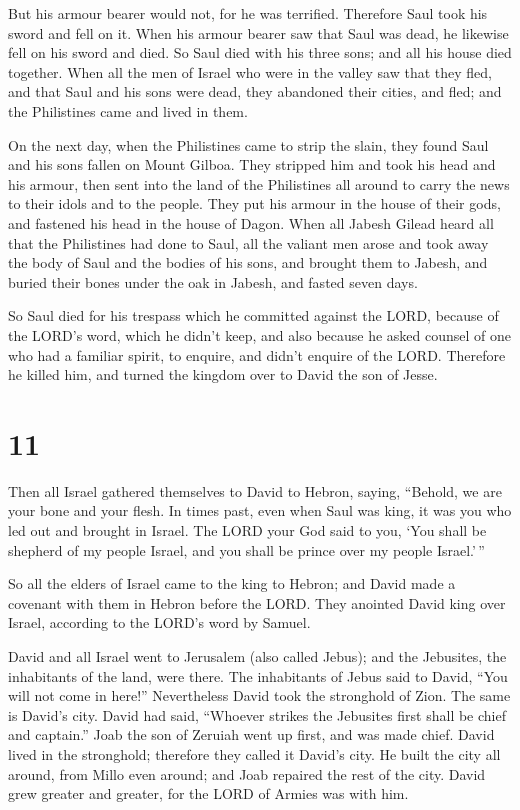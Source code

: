 But his armour bearer would not, for he was terrified. Therefore Saul
took his sword and fell on it.  When his armour bearer saw
that Saul was dead, he likewise fell on his sword and died. 
So Saul died with his three sons; and all his house died together.
 When all the men of Israel who were in the valley saw that
they fled, and that Saul and his sons were dead, they abandoned their
cities, and fled; and the Philistines came and lived in them.

 On the next day, when the Philistines came to strip the
slain, they found Saul and his sons fallen on Mount Gilboa. 
They stripped him and took his head and his armour, then sent into the
land of the Philistines all around to carry the news to their idols and
to the people.  They put his armour in the house of their
gods, and fastened his head in the house of Dagon.  When
all Jabesh Gilead heard all that the Philistines had done to Saul,
 all the valiant men arose and took away the body of Saul
and the bodies of his sons, and brought them to Jabesh, and buried their
bones under the oak in Jabesh, and fasted seven days.

 So Saul died for his trespass which he committed against
the LORD, because of the LORD's word, which he didn't keep, and also
because he asked counsel of one who had a familiar spirit, to enquire,
 and didn't enquire of the LORD. Therefore he killed him,
and turned the kingdom over to David the son of Jesse.

\hypertarget{section-10}{%
\section{11}\label{section-10}}

 Then all Israel gathered themselves to David to Hebron,
saying, ``Behold, we are your bone and your flesh.  In times
past, even when Saul was king, it was you who led out and brought in
Israel. The LORD your God said to you, `You shall be shepherd of my
people Israel, and you shall be prince over my people Israel.'\,''

 So all the elders of Israel came to the king to Hebron; and
David made a covenant with them in Hebron before the LORD. They anointed
David king over Israel, according to the LORD's word by Samuel.

 David and all Israel went to Jerusalem (also called Jebus);
and the Jebusites, the inhabitants of the land, were there. 
The inhabitants of Jebus said to David, ``You will not come in here!''
Nevertheless David took the stronghold of Zion. The same is David's
city.  David had said, ``Whoever strikes the Jebusites first
shall be chief and captain.'' Joab the son of Zeruiah went up first, and
was made chief.  David lived in the stronghold; therefore
they called it David's city.  He built the city all around,
from Millo even around; and Joab repaired the rest of the city.
 David grew greater and greater, for the LORD of Armies was
with him.

